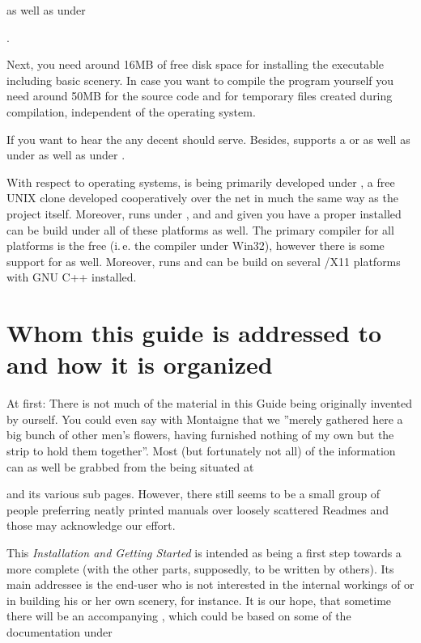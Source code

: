 
\noindent
  as well as under

.

Next, you need around 16MB of free disk space for installing the executable including
basic scenery. In case you want to compile the program yourself you need around 50MB for
the source code and for temporary files created during compilation, independent of the
operating system.

If you want to hear the  any decent  should serve.
Besides, \FlightGear supports a  or  as well as  under  as well as under .

With respect to operating systems, \FlightGear is being primarily developed under
, a free UNIX clone developed cooperatively over the net in much the same
way as the \FlightGear project itself. Moreover, \FlightGear runs under ,  and  and given you have a proper
 installed can be build under all of these platforms as well. The primary
compiler for all platforms is the free  (i.\,e. the 
compiler under Win32), however there is some support for  as well. Moreover,
\FlightGear runs and can be build on several /X11 platforms with GNU C++
installed.

\section{Whom this guide is addressed to and how it is organized}

At first: There is not much of the material in this Guide being originally invented by
ourself. You could even say with Montaigne that we ''merely gathered here a big bunch of
other men's flowers, having furnished nothing of my own but the strip to hold them
together''. Most (but fortunately not all) of the information can as well be grabbed from
the  being situated at


 \noindent
 and its various sub pages. However, there still seems to
be a small group of people preferring neatly printed manuals over
loosely scattered Readmes and those may acknowledge our effort.

This \textit{Installation and Getting Started} is intended as being a first step towards
a more complete  (with the other parts, supposedly, to
be written by others). Its main addressee is the end-user who is not interested in the
internal workings of  or in building his or her own scenery, for instance.
It is our hope, that sometime there will be an accompanying \textit{}, which could be based on some of the documentation under

